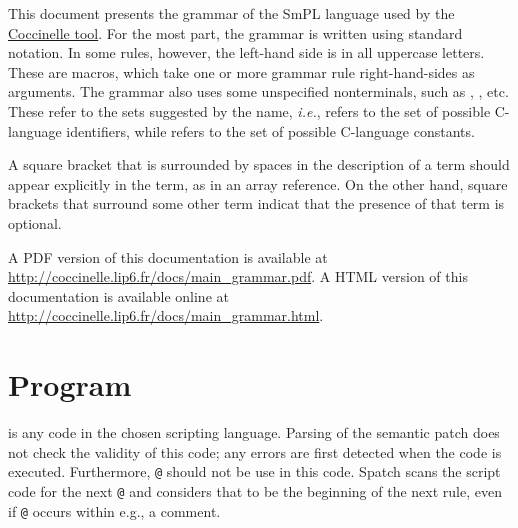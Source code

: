 


This document presents the grammar of the SmPL language used by the
\href{http://coccinelle.lip6.fr/}{Coccinelle tool}.  For the most
part, the grammar is written using standard notation.  In some rules,
however, the left-hand side is in all uppercase letters.  These are
macros, which take one or more grammar rule right-hand-sides as
arguments.  The grammar also uses some unspecified nonterminals, such
as , , etc.  These refer to the sets suggested by
the name, {\em i.e.},  refers to the set of possible
C-language identifiers, while  refers to the set of
possible C-language constants.

A square bracket that is surrounded by spaces in the description of a term
should appear explicitly in the term, as in an array reference.  On the
other hand, square brackets that surround some other term indicat that the
presence of that term is optional.

%
\ifhevea
A PDF version of this documentation is available at
\url{http://coccinelle.lip6.fr/docs/main_grammar.pdf}.
\else
A HTML version of this documentation is available online at
\url{http://coccinelle.lip6.fr/docs/main_grammar.html}.
\fi

\section{Program}

\begin{grammar}


\end{grammar}

\noindent
{} is any code in the chosen scripting language.  Parsing of
the semantic patch does not check the validity of this code; any errors are
first detected when the code is executed.  Furthermore, \texttt{@} should
not be use in this code.  Spatch scans the script code for the next
\texttt{@} and considers that to be the beginning of the next rule, even if
\texttt{@} occurs within e.g., a comment.

